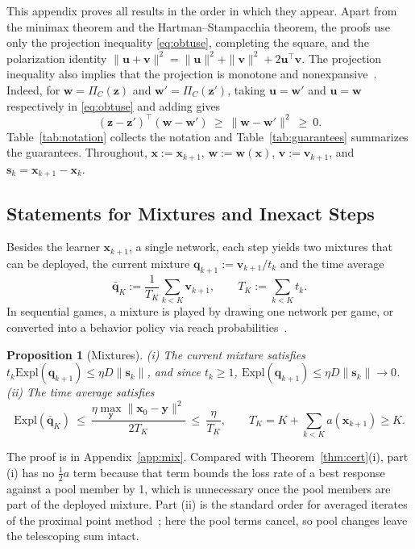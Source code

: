 \documentclass{article} %
\theoremstyle{plain}
\newtheorem{proposition}[theorem]{Proposition}
\theoremstyle{remark}
\newcommand{\Expl}{\mathrm{Expl}}
\newcommand{\Proj}{\Pi}
\newcommand{\bx}{{\bm{x}}}
\newcommand{\by}{{\bm{y}}}
\newcommand{\bv}{{\bm{v}}}
\newcommand{\bw}{{\bm{w}}}
\newcommand{\bz}{{\bm{z}}}
\newcommand{\bu}{{\bm{u}}}
\newcommand{\bq}{{\bm{q}}}
\newcommand{\dx}{{\bm{s}}}
\begin{document}
This appendix proves all results in the order in which they appear. Apart from the minimax theorem and the Hartman--Stampacchia theorem, the proofs use only the projection inequality \eqref{eq:obtuse}, completing the square, and the polarization identity $\|\bu+\bv\|^2=\|\bu\|^2+\|\bv\|^2+2\bu^\top\bv$. The projection inequality also implies that the projection is monotone and nonexpansive~\citep{bauschke2011convex}. Indeed, for $\bw=\Proj_C(\bz)$ and $\bw'=\Proj_C(\bz')$, taking $\bu=\bw'$ and $\bu=\bw$ respectively in \eqref{eq:obtuse} and adding gives
\begin{equation}
(\bz-\bz')^\top(\bw-\bw')\ \ge\ \|\bw-\bw'\|^2\ \ge\ 0 .
\label{eq:monotone}
\end{equation}
 Table~\ref{tab:notation} collects the notation and Table~\ref{tab:guarantees} summarizes the guarantees. Throughout, $\bx:=\bx_{k+1}$, $\bw:=\bw(\bx)$, $\bv:=\bv_{k+1}$, and $\dx_k=\bx_{k+1}-\bx_k$.

\subsection{Statements for Mixtures and Inexact Steps}
\label{app:inexact-statements}

Besides the learner $\bx_{k+1}$, a single network, each step yields two mixtures that can be deployed, the current mixture $\bq_{k+1}:=\bv_{k+1}/t_k$ and the time average
\[
\bar{\bq}_K:=\frac1{T_K}\sum_{k<K}\bv_{k+1},\qquad T_K:=\sum_{k<K}t_k .
\]
In sequential games, a mixture is played by drawing one network per game, or converted into a behavior policy via reach probabilities~\citep{kuhn1953}.
\begin{proposition}[Mixtures]
\label{prop:mix}
(i) The current mixture satisfies $t_k\Expl(\bq_{k+1})\le\eta D\|\dx_k\|$, and since $t_k\ge1$, $\Expl(\bq_{k+1})\le\eta D\|\dx_k\|\to0$.\\
(ii) The time average satisfies
\[
\Expl(\bar{\bq}_K)\ \le\ \frac{\eta\max_\by\|\bx_0-\by\|^2}{2T_K}\ \le\ \frac{\eta}{T_K},\qquad T_K=K+\textstyle\sum_{k<K}a(\bx_{k+1})\ge K.
\]
\end{proposition}
The proof is in Appendix~\ref{app:mix}. Compared with Theorem~\ref{thm:cert}(i), part (i) has no $\tfrac12a$ term because that term bounds the loss rate of a best response against a pool member by 1, which is unnecessary once the pool members are part of the deployed mixture. Part (ii) is the standard order for averaged iterates of the proximal point method~\citep{rockafellar1976ppa,nemirovski2004prox}; here the pool terms cancel, so pool changes leave the telescoping sum intact.
\end{document}
